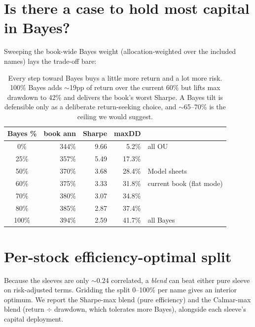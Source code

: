 \documentclass[11pt]{article}
\begin{document}
\section{Is there a case to hold most capital in Bayes?}

Sweeping the book-wide Bayes weight (allocation-weighted over the included names) lays the
trade-off bare:

\begin{table}[h]\centering\small
\renewcommand{\arraystretch}{1.12}
\begin{tabular}{c rrr l}
\toprule
\textbf{Bayes \%} & \textbf{book ann} & \textbf{Sharpe} & \textbf{maxDD} & \\
\midrule
0\%   & 344\% & 9.66 & 5.2\%  & all OU\\
25\%  & 357\% & 5.49 & 17.3\% & \\
50\%  & 370\% & 3.68 & 28.4\% & Model sheets\\
\rowcolor{bckeep} 60\%  & 375\% & 3.33 & 31.8\% & current book (flat mode)\\
70\%  & 380\% & 3.07 & 34.8\% & \\
80\%  & 385\% & 2.87 & 37.4\% & \\
100\% & 394\% & 2.59 & 41.7\% & all Bayes\\
\bottomrule
\end{tabular}
\caption*{\footnotesize Every step toward Bayes buys a little more return and a lot more risk.
100\% Bayes adds $\sim$19pp of return over the current 60\% but lifts max drawdown to 42\% and
delivers the book's worst Sharpe. A Bayes tilt is defensible only as a deliberate
return-seeking choice, and $\sim$65--70\% is the ceiling we would suggest.}
\end{table}

\section{Per-stock efficiency-optimal split}

Because the sleeves are only $\sim$0.24 correlated, a \emph{blend} can beat either pure sleeve
on risk-adjusted terms. Gridding the split 0--100\% per name gives an interior optimum. We
report the Sharpe-max blend (pure efficiency) and the Calmar-max blend (return $\div$ drawdown,
which tolerates more Bayes), alongside each sleeve's capital deployment.
\end{document}
